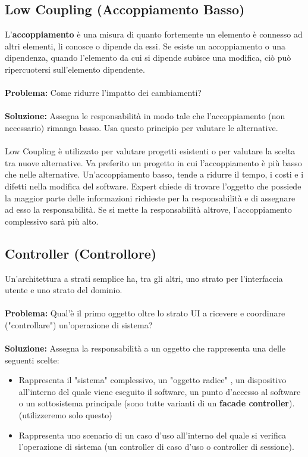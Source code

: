 \documentclass{article}
\numberwithin{equation}{subsection}
\begin{document}
\subsection{Low Coupling (Accoppiamento Basso)}
L'\textbf{accoppiamento} è una misura di quanto fortemente un elemento è connesso ad altri elementi, li conosce o dipende da essi. Se esiste un accoppiamento o una dipendenza, quando l'elemento da cui si dipende subisce una modifica, ciò può ripercuotersi sull'elemento dipendente.\\\\
\textbf{Problema: }Come ridurre l'impatto dei cambiamenti?\\\\
\textbf{Soluzione: }Assegna le responsabilità in modo tale che l'accoppiamento (non necessario) rimanga basso. Usa questo principio per valutare le alternative.\\\\
Low Coupling è utilizzato per valutare progetti esistenti o per valutare la scelta tra nuove alternative. Va preferito un progetto in cui l'accoppiamento è più basso che nelle alternative. Un'accoppiamento basso, tende a ridurre il tempo, i costi e i difetti nella modifica del software. Expert chiede di trovare l'oggetto che possiede la maggior parte delle informazioni richieste per la responsabilità e di assegnare ad esso la responsabilità. Se si mette la responsabilità altrove, l'accoppiamento complessivo sarà più alto.
\subsection{Controller (Controllore)}
Un'architettura a strati semplice ha, tra gli altri, uno strato per l'interfaccia utente e uno strato del dominio.\\\\
\textbf{Problema: } Qual'è il primo oggetto oltre lo strato UI a ricevere e coordinare ("controllare") un'operazione di sistema?\\\\
\textbf{Soluzione: } Assegna la responsabilità a un oggetto che rappresenta una delle seguenti scelte:
\begin{itemize}
    \item Rappresenta il "sistema" complessivo, un "oggetto radice" , un dispositivo all'interno del quale viene eseguito il software, un punto d'accesso al software o un sottosistema principale (sono tutte varianti di un \textbf{facade controller}). (utilizzeremo solo questo)
    \item Rappresenta uno scenario di un caso d'uso all'interno del quale si verifica l'operazione di sistema (un controller di caso d'uso o controller di sessione).
\end{itemize}
\end{document}
